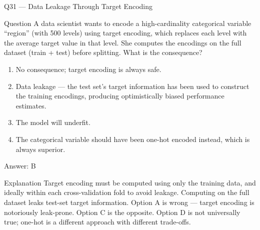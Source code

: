 \documentclass[aspectratio=169,8pt]{beamer}
\begin{document}
	\begin{frame}{Q31 --- Data Leakage Through Target Encoding}
		\begin{block}{Question}
			A data scientist wants to encode a high-cardinality categorical variable ``region'' (with 500 levels) using target encoding, which replaces each level with the average target value in that level. She computes the encodings on the full dataset (train + test) before splitting. What is the consequence?
		\end{block}
		\begin{enumerate}
			\item No consequence; target encoding is always safe.
			\item Data leakage --- the test set's target information has been used to construct the training encodings, producing optimistically biased performance estimates.
			\item The model will underfit.
			\item The categorical variable should have been one-hot encoded instead, which is always superior.
		\end{enumerate}
		\begin{exampleblock}{Answer: B}\end{exampleblock}
		\begin{block}{Explanation}
			Target encoding must be computed using only the training data, and ideally within each cross-validation fold to avoid leakage. Computing on the full dataset leaks test-set target information. Option A is wrong --- target encoding is notoriously leak-prone. Option C is the opposite. Option D is not universally true; one-hot is a different approach with different trade-offs.
		\end{block}
	\end{frame}
	
\end{document}
